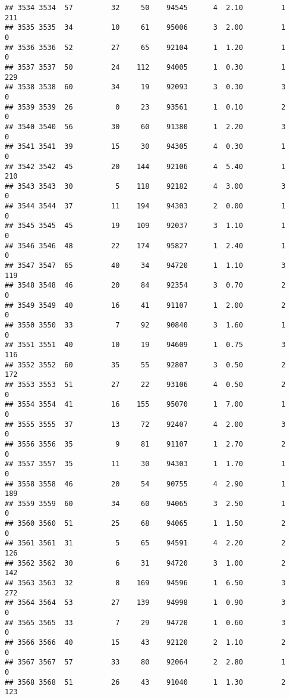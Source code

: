 \documentclass[
]{article}
\begin{document}
\begin{verbatim}
## 3534 3534  57         32     50    94545      4  2.10         1      211
## 3535 3535  34         10     61    95006      3  2.00         1        0
## 3536 3536  52         27     65    92104      1  1.20         1        0
## 3537 3537  50         24    112    94005      1  0.30         1      229
## 3538 3538  60         34     19    92093      3  0.30         3        0
## 3539 3539  26          0     23    93561      1  0.10         2        0
## 3540 3540  56         30     60    91380      1  2.20         3        0
## 3541 3541  39         15     30    94305      4  0.30         1        0
## 3542 3542  45         20    144    92106      4  5.40         1      210
## 3543 3543  30          5    118    92182      4  3.00         3        0
## 3544 3544  37         11    194    94303      2  0.00         1        0
## 3545 3545  45         19    109    92037      3  1.10         1        0
## 3546 3546  48         22    174    95827      1  2.40         1        0
## 3547 3547  65         40     34    94720      1  1.10         3      119
## 3548 3548  46         20     84    92354      3  0.70         2        0
## 3549 3549  40         16     41    91107      1  2.00         2        0
## 3550 3550  33          7     92    90840      3  1.60         1        0
## 3551 3551  40         10     19    94609      1  0.75         3      116
## 3552 3552  60         35     55    92807      3  0.50         2      172
## 3553 3553  51         27     22    93106      4  0.50         2        0
## 3554 3554  41         16    155    95070      1  7.00         1        0
## 3555 3555  37         13     72    92407      4  2.00         3        0
## 3556 3556  35          9     81    91107      1  2.70         2        0
## 3557 3557  35         11     30    94303      1  1.70         1        0
## 3558 3558  46         20     54    90755      4  2.90         1      189
## 3559 3559  60         34     60    94065      3  2.50         1        0
## 3560 3560  51         25     68    94065      1  1.50         2        0
## 3561 3561  31          5     65    94591      4  2.20         2      126
## 3562 3562  30          6     31    94720      3  1.00         2      142
## 3563 3563  32          8    169    94596      1  6.50         3      272
## 3564 3564  53         27    139    94998      1  0.90         3        0
## 3565 3565  33          7     29    94720      1  0.60         3        0
## 3566 3566  40         15     43    92120      2  1.10         2        0
## 3567 3567  57         33     80    92064      2  2.80         1        0
## 3568 3568  51         26     43    91040      1  1.30         2      123

\end{verbatim}
\end{document}
